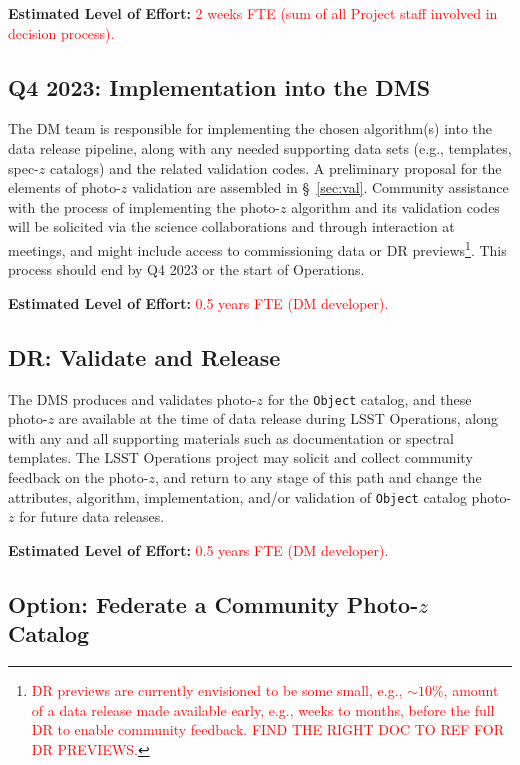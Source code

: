 \documentclass[DM,lsstdraft,toc]{lsstdoc}
\begin{document}
{\bf Estimated Level of Effort:} \textcolor{red}{2 weeks FTE (sum of all Project staff involved in decision process).}

\subsection{Q4 2023: Implementation into the DMS}\label{ssec:time_impl}

The DM team is responsible for implementing the chosen algorithm(s) into the data release pipeline, along with any needed supporting data sets (e.g., templates, spec-$z$ catalogs) and the related validation codes.
A preliminary proposal for the elements of photo-$z$ validation are assembled in \S~\ref{sec:val}.
Community assistance with the process of implementing the photo-$z$ algorithm and its validation codes will be solicited via the science collaborations and through interaction at meetings, and might include access to commissioning data or DR previews\footnote{\textcolor{red}{DR previews are currently envisioned to be some small, e.g., $\sim10\%$, amount of a data release made available early, e.g., weeks to months, before the full DR to enable community feedback. FIND THE RIGHT DOC TO REF FOR DR PREVIEWS.}}.
This process should end by Q4 2023 or the start of Operations.

{\bf Estimated Level of Effort:} \textcolor{red}{0.5 years FTE (DM developer).}

\subsection{DR: Validate and Release}\label{ssec:time_valdr}

The DMS produces and validates photo-$z$ for the {\tt Object} catalog, and these photo-$z$ are available at the time of data release during LSST Operations, along with any and all supporting materials such as documentation or spectral templates.
The LSST Operations project may solicit and collect community feedback on the photo-$z$, and return to any stage of this path and change the attributes, algorithm, implementation, and/or validation of {\tt Object} catalog photo-$z$ for future data releases.

{\bf Estimated Level of Effort:} \textcolor{red}{0.5 years FTE (DM developer).}

\subsection{Option: Federate a Community Photo-$z$ Catalog}\label{ssec:time_opt}
\end{document}
